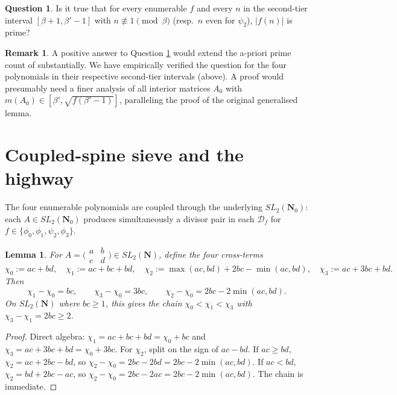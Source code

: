 \documentclass[11pt]{article}
\newtheorem{lemma}[theorem]{Lemma}
\theoremstyle{definition}
\newtheorem{remark}[theorem]{Remark}
\newtheorem{question}[theorem]{Question}
\newcommand{\N}{\mathbf{N}}
\newcommand{\Nz}{\mathbf{N}_0}
\newcommand{\SLNz}{SL_2(\Nz)}
\newcommand{\SLN}{SL_2(\N)}
\begin{document}
\begin{question}\label{q:second-tier}
Is it true that for every enumerable $f$ and every $n$ in the second-tier interval $[\beta+1, \beta'-1]$ with $n \not\equiv 1 \pmod \beta$ (resp.\ $n$ even for $\psi_2$), $|f(n)|$ is prime?
\end{question}

\begin{remark}
A positive answer to Question \ref{q:second-tier} would extend the a-priori prime count of \cite[Example 1.4]{B8} substantially. We have empirically verified the question for the four polynomials in their respective second-tier intervals (above). A proof would presumably need a finer analysis of all interior matrices $A_0$ with $m(A_0) \in [\beta', \sqrt{f(\beta'-1)}]$, paralleling the proof of the original generalised lemma.
\end{remark}

\section{Coupled-spine sieve and the highway}\label{sec:joint}

The four enumerable polynomials are coupled through the underlying $\SLNz$: each $A \in \SLNz$ produces simultaneously a divisor pair in each $\mathcal{D}_f$ for $f \in \{\phi_0, \phi_1, \psi_2, \phi_3\}$.

\begin{lemma}\label{lem:joint-cross}
For $A = \bigl(\begin{smallmatrix}a&b\\c&d\end{smallmatrix}\bigr) \in \SLN$, define the four cross-terms
\[
\chi_0 := ac+bd, \quad \chi_1 := ac+bc+bd, \quad \chi_2 := \max(ac,bd) + 2bc - \min(ac,bd), \quad \chi_3 := ac+3bc+bd.
\]
Then
\[
\chi_1 - \chi_0 = bc, \qquad \chi_3 - \chi_0 = 3 bc, \qquad \chi_2 - \chi_0 = 2bc - 2\min(ac, bd).
\]
On $\SLN$ where $bc \ge 1$, this gives the chain $\chi_0 < \chi_1 < \chi_3$ with $\chi_3 - \chi_1 = 2bc \ge 2$.
\end{lemma}

\begin{proof}
Direct algebra: $\chi_1 = ac+bc+bd = \chi_0 + bc$ and $\chi_3 = ac+3bc+bd = \chi_0+3bc$. For $\chi_2$, split on the sign of $ac - bd$. If $ac \ge bd$, $\chi_2 = ac+2bc-bd$, so $\chi_2 - \chi_0 = 2bc - 2bd = 2bc - 2\min(ac,bd)$. If $ac < bd$, $\chi_2 = bd+2bc-ac$, so $\chi_2 - \chi_0 = 2bc - 2ac = 2bc - 2\min(ac,bd)$. The chain is immediate.
\end{proof}
\end{document}
